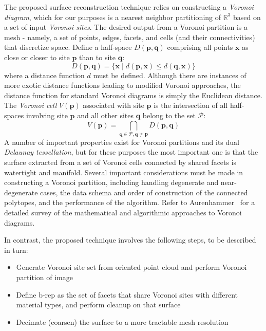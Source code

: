 The proposed surface reconstruction technique relies on constructing a \textit{Voronoi diagram}, which for our purposes is a nearest neighbor partitioning of $\mathbb{R}^3$ based on a set of input \textit{Voronoi sites}. The desired output from a Voronoi partition is a mesh - namely, a set of points, edges, facets, and cells (and their connectivities) that discretize space. Define a half-space $D(\bm{p},\bm{q})$ comprising all points $\bm{x}$ as close or closer to site $\bm{p}$ than to site $\bm{q}$:
\begin{equation}
D(\bm{p},\bm{q}) = \{\bm{x} \mid d(\bm{p},\bm{x}) \leq d(\bm{q},\bm{x})\}
\end{equation}
where a distance function $d$ must be defined. Although there are instances of more exotic distance functions leading to modified Voronoi approaches, the distance function for standard Voronoi diagrams is simply the Euclidean distance. The \textit{Voronoi cell} $V(\bm{p})$ associated with site $\bm{p}$ is the intersection of all half-spaces involving site $\bm{p}$ and all other sites $\bm{q}$ belong to the set $\mathcal{P}$:
\begin{equation}
V(\bm{p}) = \bigcap \limits_{\bm{q} \in \mathcal{P}, \bm{q} \neq \bm{p}} D(\bm{p},\bm{q})
\end{equation}
A number of important properties exist for Voronoi partitions and its dual \textit{Delaunay tessellation}, but for these purposes the most important one is that the surface extracted from a set of Voronoi cells connected by shared facets is watertight and manifold. Several important considerations must be made in constructing a Voronoi partition, including handling degenerate and near-degenerate cases, the data schema and order of construction of the connected polytopes, and the
performance of the algorithm. Refer to Aurenhammer~\cite{aurenhammer_1991} for a detailed survey of the mathematical and algorithmic approaches to Voronoi diagrams.

In contrast, the proposed technique involves the following steps, to be described in turn:
\begin{itemize}[noitemsep]
\item Generate Voronoi site set from oriented point cloud and perform Voronoi partition of image
\item Define b-rep as the set of facets that share Voronoi sites with different material types, and perform cleanup on that surface
\item Decimate (coarsen) the surface to a more tractable mesh resolution
\end{itemize}

